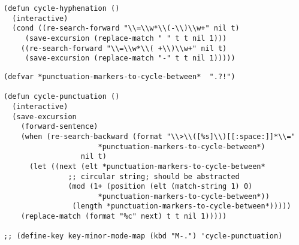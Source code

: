 \documentclass[11pt]{article}
\begin{document}
\label{sec:orgaac1c07}

\begin{verbatim}
(defun cycle-hyphenation ()
  (interactive)
  (cond ((re-search-forward "\\=\\w*\\(-\\)\\w+" nil t)
	 (save-excursion (replace-match " " t t nil 1)))
	((re-search-forward "\\=\\w*\\( +\\)\\w+" nil t)
	 (save-excursion (replace-match "-" t t nil 1)))))
\end{verbatim}

\label{sec:orgdcb834c}

\begin{verbatim}
(defvar *punctuation-markers-to-cycle-between*  ".?!")

(defun cycle-punctuation ()
  (interactive)
  (save-excursion
    (forward-sentence)
    (when (re-search-backward (format "\\>\\([%s]\\)[[:space:]]*\\="
				      *punctuation-markers-to-cycle-between*)
			      nil t)
      (let ((next (elt *punctuation-markers-to-cycle-between*
		       ;; circular string; should be abstracted
		       (mod (1+ (position (elt (match-string 1) 0)
					  *punctuation-markers-to-cycle-between*))
			    (length *punctuation-markers-to-cycle-between*)))))
	(replace-match (format "%c" next) t t nil 1)))))

;; (define-key key-minor-mode-map (kbd "M-.") 'cycle-punctuation)
\end{verbatim}
\end{document}
